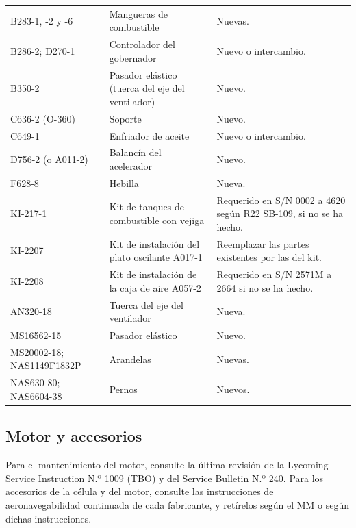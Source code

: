 {\begin{longtable}{@{}p{2.1cm}p{2.6cm}p{\dimexpr\linewidth-4.7cm-4\tabcolsep}@{}}
B283-1, -2 y -6 & Mangueras de combustible & Nuevas. \\
B286-2; D270-1 & Controlador del gobernador & Nuevo o intercambio. \\
B350-2 & Pasador elástico (tuerca del eje del ventilador) & Nuevo. \\
C636-2 (O-360) & Soporte & Nuevo. \\
C649-1 & Enfriador de aceite & Nuevo o intercambio. \\
D756-2 (o A011-2) & Balancín del acelerador & Nuevo. \\
F628-8 & Hebilla & Nueva. \\
KI-217-1 & Kit de tanques de combustible con vejiga & Requerido en S/N 0002 a 4620 según R22 SB-109, si no se ha hecho. \\
KI-2207 & Kit de instalación del plato oscilante A017-1 & Reemplazar las partes existentes por las del kit. \\
KI-2208 & Kit de instalación de la caja de aire A057-2 & Requerido en S/N 2571M a 2664 si no se ha hecho. \\
AN320-18 & Tuerca del eje del ventilador & Nueva. \\
MS16562-15 & Pasador elástico & Nuevo. \\
MS20002-18; NAS1149F1832P & Arandelas & Nuevas. \\
NAS630-80; NAS6604-38 & Pernos & Nuevos. \\
\bottomrule
\end{longtable}}

\subsection{Motor y accesorios}

Para el mantenimiento del motor, consulte la última revisión de la Lycoming Service Instruction N.º 1009 (TBO) y del Service Bulletin N.º 240. Para los accesorios de la célula y del motor, consulte las instrucciones de aeronavegabilidad continuada de cada fabricante, y retírelos según el MM o según dichas instrucciones.
